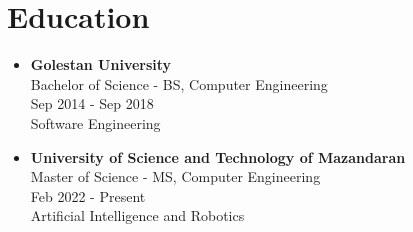 \section*{\LARGE{Education}}
\begin{itemize}
    \item \large{\textbf{Golestan University}\\}\normalsize{Bachelor of Science - BS, Computer Engineering\\Sep 2014 - Sep 2018\\Software Engineering}
    \item \large{\textbf{University of Science and Technology of Mazandaran}\\}\normalsize{Master of Science - MS, Computer Engineering\\Feb 2022 - Present\\Artificial Intelligence and Robotics}
\end{itemize}